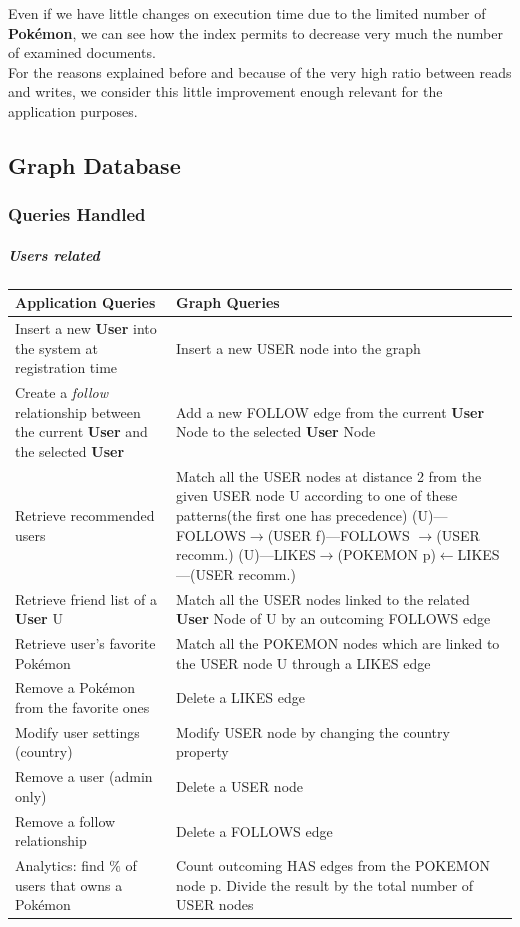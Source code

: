 Even if we have little changes on execution time due to the limited number of \textbf{Pokémon}, we can see how the index permits to decrease very much the number of examined documents. \\
For the reasons explained before and because of the very high ratio between reads and writes, we consider this little improvement enough relevant for the application purposes. 

\subsection{Graph Database}
\subsubsection{Queries Handled}
\subparagraph{Users related}
\begin{center}
	\begin{tabular}{|p{}| p{} |} 
		\hline
		\textbf{Application Queries} & \textbf{Graph Queries} \\ [0.5ex] 
		\hline
		Insert a new \textbf{User} into the system at registration time 		
		& Insert a new USER node into the graph\\ 
		\hline
		Create a \textit{follow} relationship between the current \textbf{User} and the selected \textbf{User}		
		& Add a new FOLLOW edge from the current \textbf{User} Node to the selected \textbf{User} Node \\ 
		\hline
		Retrieve recommended users
		& Match all the USER nodes at distance 2 from the given USER node U according to one of these patterns(the first one has precedence)
		(U)—FOLLOWS$\rightarrow$(USER f)—FOLLOWS $\rightarrow$(USER recomm.)
		(U)—LIKES$\rightarrow$(POKEMON p)$\leftarrow$LIKES—(USER recomm.)
		\\
		\hline
		Retrieve friend list of a \textbf{User} U
		& Match all the USER nodes linked to the related \textbf{User} Node of U by an outcoming FOLLOWS edge\\
		\hline	
		Retrieve user’s favorite Pokémon 
		& Match all the POKEMON nodes which are linked to the USER node U through a LIKES edge\\
		\hline	
		Remove a Pokémon from the favorite ones
		& Delete a LIKES edge\\
		\hline
		Modify user settings (country)
		& Modify USER node by changing the country property\\
		\hline	
		Remove a user (admin only)
		& Delete a USER node\\
		\hline		
		Remove a follow relationship
		& Delete a FOLLOWS edge\\
		\hline
		Analytics: find $\%$ of users that owns a Pokémon
		& Count outcoming HAS edges from the POKEMON node p. 
		Divide the result by the total number of USER nodes\\
		\hline
	\end{tabular}
\end{center}

